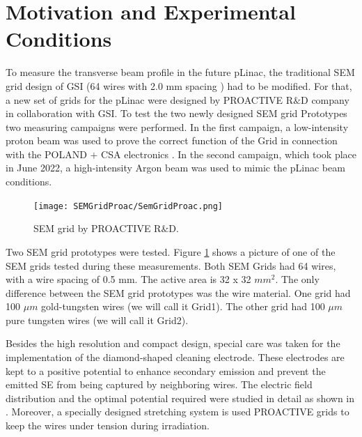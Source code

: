 \section{Motivation and Experimental Conditions}
\label{sec:GSIexpCond}

To measure the transverse beam profile in the future pLinac, the traditional SEM grid design of GSI (64 wires with 2.0 mm spacing ) had to be modified. For that, a new set of grids for the pLinac were designed by PROACTIVE R$\&$D company in collaboration with GSI. To test the two newly designed SEM grid Prototypes two measuring campaigns were performed. In the first campaign, a low-intensity proton beam was used to prove the correct function of the Grid in connection with the POLAND $+$ CSA electronics \parencite[]{ref:ElectronicsSEMgsi}. In the second campaign, which took place in June 2022, a high-intensity Argon beam was used to mimic the pLinac beam conditions. 

\begin{figure}[h]
    \centering
    \texttt{[image: SEMGridProac/SemGridProac.png]}
    \caption{SEM grid by PROACTIVE R$\&$D. }
    \label{fig:SEMGridProactive}
\end{figure}

Two SEM grid prototypes were tested. Figure \ref{fig:SEMGridProactive} shows a picture of one of the SEM grids tested during these measurements. Both SEM Grids had 64 wires, with a wire spacing of 0.5 mm.  The active area is 32 x 32 $mm^2$. The only difference between the SEM grid prototypes was the wire material. One grid had 100 $\mu m$ gold-tungsten wires (we will call it Grid1). The other grid had 100 $\mu m$ pure tungsten wires (we will call it Grid2).

Besides the high resolution and compact design, special care was taken for the implementation of the diamond-shaped cleaning electrode. These electrodes are kept to a positive potential to enhance secondary emission and prevent the emitted SE from being captured by neighboring wires. The electric field distribution and the optimal potential required were studied in detail as shown in \parencite*[]{ref:ElectriFieldStudies}. Moreover, a specially designed stretching system is used PROACTIVE grids to keep the wires under tension during irradiation.

